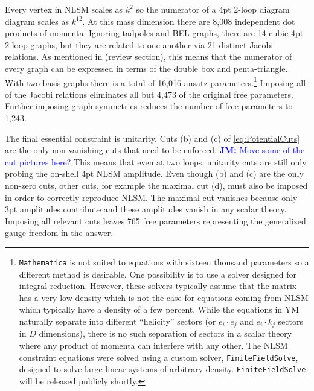 \documentclass[11pt,letter]{article}
\newcommand{\jm}[1]{\textcolor{blue}{\textbf{JM: }{#1}}}
\begin{document}
Every vertex in NLSM scales as $k^2$ so the numerator of a 4pt 2-loop diagram diagram scales as $k^{12}$.
At this mass dimension there are 8,008 independent dot products of momenta.
Ignoring tadpoles and BEL graphs, there are 14 cubic 4pt 2-loop graphs, but they are related to one another via 21 distinct Jacobi relations.
As mentioned in (review section), this means that the numerator of every graph can be expressed in terms of the double box and penta-triangle.
With two basis graphs there is a total of 16,016 ansatz parameters.\footnote{\texttt{Mathematica} is not suited to equations with sixteen thousand parameters so a different method is desirable.
One possibility is to use a solver designed for integral reduction.
However, these solvers typically assume that the matrix has a very low density which is not the case for equations coming from NLSM which typically have a density of a few percent.
While the equations in YM naturally separate into different ``helicity'' sectors (or $e_i \cdot e_j$ and $e_i \cdot k_j$ sectors in $D$ dimensions), there is no such separation of sectors in a scalar theory where any product of momenta can interfere with any other.
The NLSM constraint equations were solved using a custom solver, \texttt{FiniteFieldSolve}, designed to solve large linear systems of arbitrary density.
\texttt{FiniteFieldSolve} will be released publicly shortly.}
Imposing all of the Jacobi relations eliminates all but 4,473 of the original free parameters.
Further imposing graph symmetries reduces the number of free parameters to 1,243.

The final essential constraint is unitarity.
Cuts (b) and (c) of \cref{eq:PotentialCuts} are the only non-vanishing cuts that need to be enforced.  \jm{Move some of the cut pictures here?}
This means that even at two loops, unitarity cuts are still only probing the on-shell 4pt NLSM amplitude.
Even though (b) and (c) are the only non-zero cuts, other cuts, for example the maximal cut (d), must also be imposed in order to correctly reproduce NLSM.
The maximal cut vanishes because only 3pt amplitudes contribute and these amplitudes vanish in any scalar theory.
Imposing all relevant cuts leaves 765 free parameters representing the generalized gauge freedom in the answer.
\end{document}
